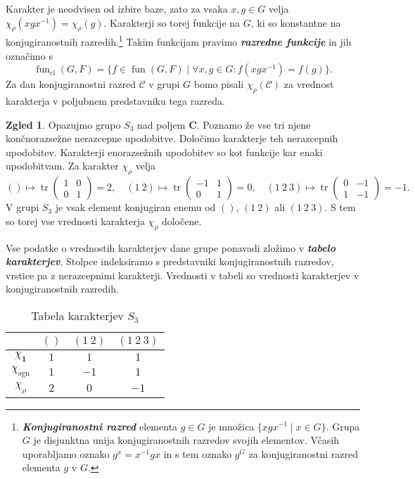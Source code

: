 \documentclass[11pt]{book}
\def\CC{\mathbf{C}}
\def\conclass{\mathcal{C}}
\def\11{\mathbf{1}}
\DeclareMathOperator\sgn{sgn}
\DeclareMathOperator\tr{tr}
\DeclareMathOperator\cl{cl}
\DeclareMathOperator\fun{fun}
\def\definicija{\color{rdeca}\bf\em}
\theoremstyle{definition}
\theoremstyle{zgled}
\newtheorem*{zgled}{Zgled}
\theoremstyle{odprtproblem}
\theoremstyle{domacanaloga}
\theoremstyle{izrek}
\begin{document}
Karakter je neodvisen od izbire baze, zato za vsaka $x, g \in G$ velja $\chi_{\rho}(x g x^{-1}) = \chi_{\rho}(g)$. Karakterji so torej funkcije na $G$, ki so konstantne na konjugiranostnih razredih.\footnote{{\definicija Konjugiranostni razred} elementa $g \in G$ je množica $\{ x g x^{-1} \mid x \in G \}$. Grupa $G$ je disjunktna unija konjugiranostnih razredov svojih elementov. Včasih uporabljamo oznako $g^x = x^{-1} g x$ in s tem oznako $g^G$ za konjugiranostni razred elementa $g$ v $G$.} Takim funkcijam pravimo {\definicija razredne funkcije} in jih označimo s
\[
    \fun_{\cl}(G,F) = \{ f \in \fun(G,F) \mid \forall x, g \in G \colon f(x g x^{-1}) = f(g) \}.
\]
Za dan konjugiranostni razred $\conclass$ v grupi $G$ bomo pisali $\chi_{\rho}(\conclass)$ za vrednost karakterja v poljubnem predstavniku tega razreda.

\begin{zgled}
Opazujmo grupo $S_3$ nad poljem $\CC$. Poznamo že vse tri njene končnorazsežne nerazcepne upodobitve. Določimo karakterje teh nerazcepnih upodobitev. Karakterji enorazsežnih upodobitev so kot funkcije kar enaki upodobitvam. Za karakter $\chi_{\rho}$ velja
\[
    () \mapsto \tr \begin{pmatrix}
        1 & 0 \\ 0 & 1
    \end{pmatrix} = 2, \quad
    (1 \ 2) \mapsto \tr \begin{pmatrix}
        -1 & 1 \\ 0 & 1
    \end{pmatrix} = 0, \quad
    (1 \ 2 \ 3) \mapsto \tr \begin{pmatrix}
        0 & -1 \\ 1 & -1
    \end{pmatrix} = -1.
\]
V grupi $S_3$ je vsak element konjugiran enemu od $()$, $(1 \ 2)$ ali $(1 \ 2 \ 3)$. S tem so torej vse vrednosti karakterja $\chi_{\rho}$ določene.

Vse podatke o vrednostih karakterjev dane grupe ponavadi zložimo v {\definicija tabelo karakterjev}. Stolpce indeksiramo s predstavniki konjugiranostnih razredov, vrstice pa z nerazcepnimi karakterji. Vrednosti v tabeli so vrednosti karakterjev v konjugiranostnih razredih.

\begin{table}[t]
     \centering
\begin{tabular}{c|ccc}
     & $()$ & $(1 \ 2)$ & $(1 \ 2 \ 3)$ \\ \hline
     $\chi_{\11}$ & $1$ & $1$ & $1$ \\
     $\chi_{\sgn}$ & $1$ & $-1$ & $1$ \\
     $\chi_{\rho}$ & $2$ & $0$ & $-1$ \\
\end{tabular}
\caption{Tabela karakterjev $S_3$}
\end{table}
\end{zgled}
\end{document}
